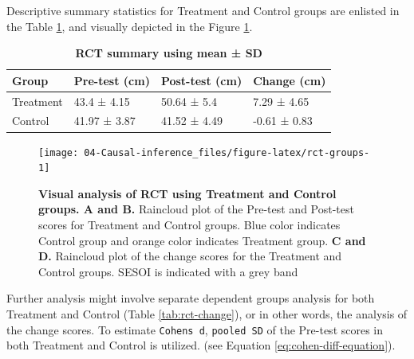 \documentclass[
]{book}
\begin{document}
Descriptive summary statistics for Treatment and Control groups are enlisted in the Table \ref{tab:rct-summary}, and visually depicted in the Figure \ref{fig:rct-groups}.



\begin{table}

\caption{\label{tab:rct-summary}\textbf{RCT summary using mean ± SD}}
\centering
\begin{tabular}[t]{llll}
\toprule
Group & Pre-test (cm) & Post-test (cm) & Change (cm)\\
\midrule
Treatment & 43.4 ± 4.15 & 50.64 ± 5.4 & 7.29 ± 4.65\\
Control & 41.97 ± 3.87 & 41.52 ± 4.49 & -0.61 ± 0.83\\
\bottomrule
\end{tabular}
\end{table}

\begin{figure}

{\centering \texttt{[image: 04-Causal-inference\_files/figure-latex/rct-groups-1]} 

}

\caption{\textbf{Visual analysis of RCT using Treatment and Control groups. A and B. }Raincloud plot of the Pre-test and Post-test scores for Treatment and Control groups. Blue color indicates Control group and orange color indicates Treatment group. \textbf{C and D.} Raincloud plot of the change scores for the Treatment and Control groups. SESOI is indicated with a grey band}\label{fig:rct-groups}
\end{figure}



Further analysis might involve separate dependent groups analysis for both Treatment and Control (Table \ref{tab:rct-change}), or in other words, the analysis of the change scores. To estimate \texttt{Cohen\textquotesingle{}s\ d}, \texttt{pooled\ SD} of the Pre-test scores in both Treatment and Control is utilized. (see Equation \eqref{eq:cohen-diff-equation}).
\end{document}
